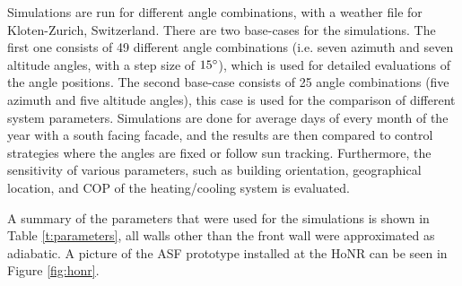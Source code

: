 		Simulations are run for different angle combinations, with a weather file for Kloten-Zurich, Switzerland. There are two base-cases for the simulations. The first one consists of 49 different angle combinations (i.e. seven azimuth and seven altitude angles, with a step size of $15\degree$), which is used for detailed evaluations of the angle positions. The second base-case consists of 25 angle combinations (five azimuth and five altitude angles), this case is used for the comparison of different system parameters. Simulations are done for average days of every month of the year with a south facing facade, and the results are then compared to control strategies where the angles are fixed or follow sun tracking. Furthermore, the sensitivity of various parameters, such as building orientation, geographical location, and COP of the heating/cooling system is evaluated. 

		A summary of the parameters that were used for the simulations is shown in Table \ref{t:parameters}, all walls other than the front wall were approximated as adiabatic. A picture of the ASF prototype installed at the HoNR can be seen in Figure \ref{fig:honr}. 

		


